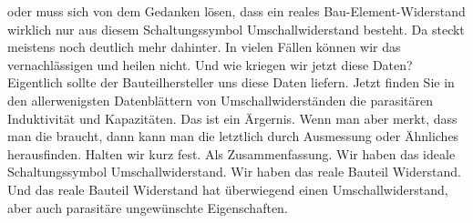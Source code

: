 \begin{frame}
{oder muss sich von dem Gedanken lösen, dass ein reales Bau-Element-Widerstand wirklich nur aus diesem Schaltungssymbol Umschallwiderstand besteht. Da steckt meistens noch deutlich mehr dahinter. In vielen Fällen können wir das vernachlässigen und heilen nicht. Und wie kriegen wir jetzt diese Daten? Eigentlich sollte der Bauteilhersteller uns diese Daten liefern. Jetzt finden Sie in den allerwenigsten Datenblättern von Umschallwiderständen die parasitären Induktivität und Kapazitäten. Das ist ein Ärgernis. Wenn man aber merkt, dass man die braucht, dann kann man die letztlich durch Ausmessung oder Ähnliches herausfinden. Halten wir kurz fest. Als Zusammenfassung. Wir haben das ideale Schaltungssymbol Umschallwiderstand. Wir haben das reale Bauteil Widerstand. Und das reale Bauteil Widerstand hat überwiegend einen Umschallwiderstand, aber auch parasitäre ungewünschte Eigenschaften.

}

\end{frame}

